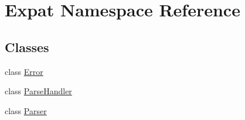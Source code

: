 \hypertarget{namespace_expat}{}\section{Expat Namespace Reference}
\label{namespace_expat}
\subsection*{Classes}
\begin{DoxyCompactItemize}
\item 
class \hyperlink{class_expat_1_1_error}{Error}
\item 
class \hyperlink{class_expat_1_1_parse_handler}{Parse\+Handler}
\item 
class \hyperlink{class_expat_1_1_parser}{Parser}
\end{DoxyCompactItemize}
